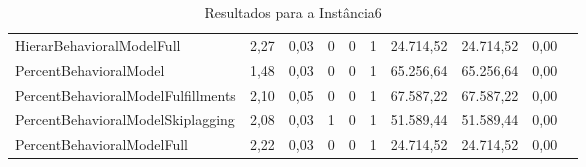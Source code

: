 \begin{table}[H]
{\begin{tabular}{lccccccccc}
            HierarBehavioralModelFull & 2,27 & 0,03 & 0 & 0 & 1 & 24.714,52 & 24.714,52 & 0,00 \\
            PercentBehavioralModel & 1,48 & 0,03 & 0 & 0 & 1 & 65.256,64 & 65.256,64 & 0,00 \\
            PercentBehavioralModelFulfillments & 2,10 & 0,05 & 0 & 0 & 1 & 67.587,22 & 67.587,22 & 0,00 \\
            PercentBehavioralModelSkiplagging & 2,08 & 0,03 & 1 & 0 & 1 & 51.589,44 & 51.589,44 & 0,00 \\
            PercentBehavioralModelFull & 2,22 & 0,03 & 0 & 0 & 1 & 24.714,52 & 24.714,52 & 0,00 \\ \hline
        \end{tabular}%
    }
    \caption{Resultados para a Instância6}
    \label{tab:resultado_instancia6}
\end{table}


